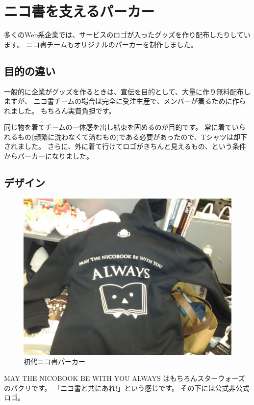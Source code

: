 \section{ニコ書を支えるパーカー}

多くのWeb系企業では、サービスのロゴが入ったグッズを作り配布したりしています。
ニコ書チームもオリジナルのパーカーを制作しました。

\subsection{目的の違い}

一般的に企業がグッズを作るときは、宣伝を目的として、大量に作り無料配布しますが、
ニコ書チームの場合は完全に受注生産で、メンバーが着るために作られました。
もちろん実費負担です。

同じ物を着てチームの一体感を出し結束を固めるのが目的です。
常に着ていられるもの(頻繁に洗わなくて済むもの)である必要があったので、Tシャツは却下されました。
さらに、外に着て行けてロゴがきちんと見えるもの、という条件からパーカーになりました。

\subsection{デザイン}

\begin{figure}[H]
\centering
\includegraphics[width=\textwidth]{../images/unko.jpg}
\caption{初代ニコ書パーカー}
\end{figure}

MAY THE NICOBOOK BE WITH YOU ALWAYS
はもちろんスターウォーズのパクリです。
「ニコ書と共にあれ!」という感じです。 その下には公式非公式ロゴ。

